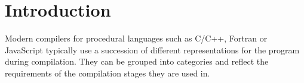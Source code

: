 

\pagebreak
\section{Introduction}

    Modern compilers for procedural languages such as
    C/C++, Fortran or JavaScript typically use a succession of different
    representations for the program during compilation.
    They can be grouped into categories and reflect the requirements of
    the compilation stages they are used in.


